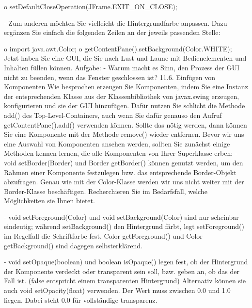 o	setDefaultCloseOperation(JFrame.EXIT_ON_CLOSE);

-	Zum anderen möchten Sie vielleicht die Hintergrundfarbe anpassen. Dazu ergänzen Sie einfach die folgenden Zeilen an der jeweils passenden Stelle:

o	import java.awt.Color;
o	getContentPane().setBackground(Color.WHITE);
Jetzt haben Sie eine GUI, die Sie nach Lust und Laune mit Bedienelementen und Inhalten füllen können.
Aufgabe:
-	Warum macht es Sinn, den Prozess der GUI nicht zu beenden, wenn das Fenster geschlossen ist?
11.6.	Einfügen von Komponenten
Wie besprochen erzeugen Sie Komponenten, indem Sie eine Instanz der entsprechenden Klasse aus der Klassenbibliothek von javax.swing erzeugen, konfigurieren und sie der GUI hinzufügen. Dafür nutzen Sie schlicht die Methode add() des Top-Level-Containers, auch wenn Sie dafür genauso den Aufruf getContentPane().add() verwenden können.
Sollte das nötig werden, dann können Sie eine Komponente mit der Methode remove() wieder entfernen.
Bevor wir uns eine Auswahl von Komponenten ansehen werden, sollten Sie zunächst einige Methoden kennen lernen, die alle Komponenten von Ihrer Superklasse erben:
-	void setBorder(Border) und Border getBorder() können genutzt werden, um den Rahmen einer Komponente festzulegen bzw. das entsprechende Border-Objekt abzufragen. Genau wie mit der Color-Klasse werden wir uns nicht weiter mit der Border-Klasse beschäftigen. Recherchieren Sie im Bedarfsfall, welche Möglichkeiten sie Ihnen bietet.

-	void setForeground(Color) und void setBackground(Color) sind nur scheinbar eindeutig; während setBackground() den Hintergrund färbt, legt setForeground() im Regelfall die Schriftfarbe fest. Color getForeground() und Color getBackground() sind dagegen selbsterklärend.

-	void setOpaque(boolean) und boolean isOpaque() legen fest, ob der Hintergrund der Komponente verdeckt oder transparent sein soll, bzw. geben an, ob das der Fall ist. (false entspricht einem transparenten Hintergrund) Alternativ können sie auch void setOpacity(float) verwenden. Der Wert muss zwischen 0.0 und 1.0 liegen. Dabei steht 0.0 für vollständige transparenz.

